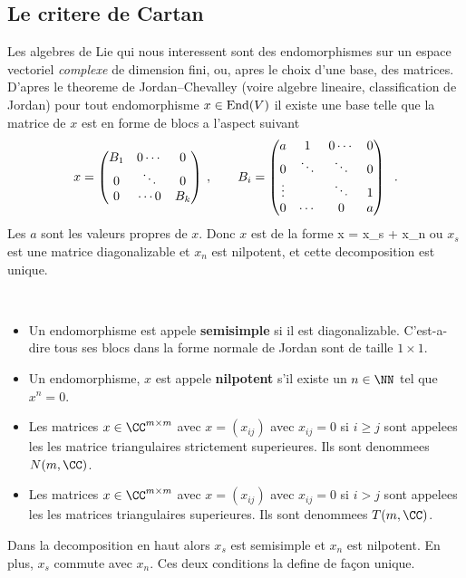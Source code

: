 \subsection{Le critere de Cartan}
Les algebres de Lie qui nous interessent sont des endomorphismes sur un espace vectoriel {\em complexe} 
de dimension 
fini, ou, apres le choix d'une base, des matrices. D'apres le  theoreme de Jordan--Chevalley (voire algebre lineaire, classification de Jordan) pour tout endomorphisme $x\in {\rm End}(V)$ il existe une base telle que
la matrice de $x$ est en forme de blocs a l'aspect suivant
$$
x = \left(\begin{matrix} B_1 &  0 \cdots & 0 \cr  0 & \ddots & 0 \cr  0 & \cdots 0 & B_k \end{matrix}\right) \: , \qquad
                  B_i  =   \left(\begin{matrix}  a& 1 & 0 \cdots & 0 \cr  0 & \ddots &\ddots  & 0 
                                                    \cr \vdots &  & \ddots & 1 \cr 0 & \cdots & 0 & a \end{matrix}\right) \; ~ .
$$
Les $a$ sont les valeurs propres de $x$. Donc $x$ est de la forme
\be x  = x_s + x_n \label{e:semnil}  \ee
ou $x_s$ est une matrice diagonalizable et $x_n$ est nilpotent, et cette decomposition est unique.
\begin{ddd} ~~\label{d:mat}
\begin{itemize}
\item
Un endomorphisme est appele {\bf  semisimple} si il est diagonalizable. C'est-a-dire tous ses blocs dans 
la forme normale de Jordan sont de taille $1\times 1$.
\item Un endomorphisme, $x$ est appele {\bf nilpotent} s'il existe un $n\in\NN$ tel que $x^n=0$. 
\item Les matrices $x\in \CC^{m\times m}$ avec $x= \left(x_{ij}\right)$ avec $x_{ij} =0$ si $i\ge j$ sont
appelees les les matrice triangulaires strictement superieures. Ils sont denommees $N(m,\CC)$.
\item Les matrices $x\in \CC^{m\times m}$ avec $x= \left(x_{ij}\right)$ avec $x_{ij} =0$ si $i> j$ sont
appelees les les matrices triangulaires  superieures. Ils sont denommees $T(m,\CC)$.
\end{itemize}
\end{ddd}

Dans la decomposition en haut alors $x_s$ est  semisimple et $x_n$ est nilpotent. 
En plus, $x_s$ commute avec $x_n$. Ces deux conditions la define de fa\c{c}on unique.

